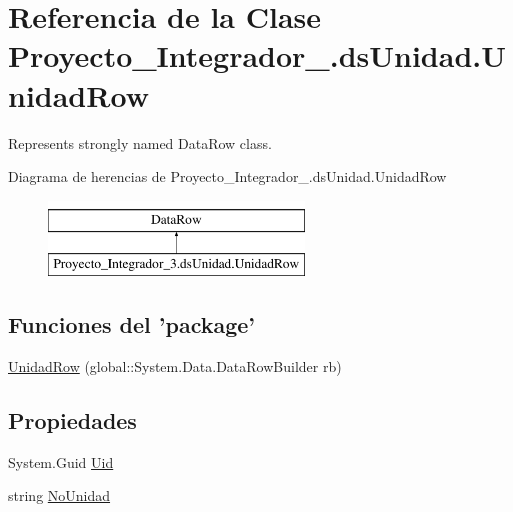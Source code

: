 \hypertarget{class_proyecto___integrador__3_1_1ds_unidad_1_1_unidad_row}{\section{Referencia de la Clase Proyecto\-\_\-\-Integrador\-\_.\-ds\-Unidad.\-Unidad\-Row}
\label{class_proyecto___integrador__3_1_1ds_unidad_1_1_unidad_row}
}


Represents strongly named Data\-Row class.  


Diagrama de herencias de Proyecto\-\_\-\-Integrador\-\_.\-ds\-Unidad.\-Unidad\-Row\begin{figure}[H]
\begin{center}
\leavevmode
\includegraphics[height=2.000000cm]{class_proyecto___integrador__3_1_1ds_unidad_1_1_unidad_row}
\end{center}
\end{figure}
\subsection*{Funciones del 'package'}
\begin{DoxyCompactItemize}
\item 
\hyperlink{class_proyecto___integrador__3_1_1ds_unidad_1_1_unidad_row_a62eca4ec465132b573d8e8d1f4d2550a}{Unidad\-Row} (global\-::\-System.\-Data.\-Data\-Row\-Builder rb)
\end{DoxyCompactItemize}
\subsection*{Propiedades}
\begin{DoxyCompactItemize}
\item 
System.\-Guid \hyperlink{class_proyecto___integrador__3_1_1ds_unidad_1_1_unidad_row_ab7854a6f12858fc9c8de66c59b342863}{Uid}
\item 
string \hyperlink{class_proyecto___integrador__3_1_1ds_unidad_1_1_unidad_row_a0b25b1745987d784d4554fb0f34c1f58}{No\-Unidad}
\end{DoxyCompactItemize}
